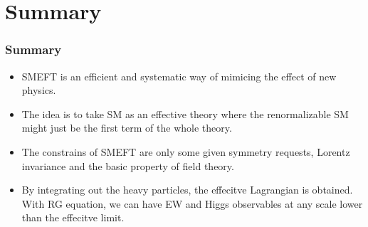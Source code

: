 \documentclass[8pt]{beamer}
\begin{document}
\section{Summary}
\begin{frame}
  \frametitle{Summary}
  \begin{itemize}
  \item SMEFT is an efficient and systematic way of mimicing the effect of new physics. 
  
  \item The idea is to take SM as an effective theory where the renormalizable SM might just be the first term of the whole theory.

  \item The constrains of SMEFT are only some given symmetry requests, Lorentz invariance and the basic property of field theory.
  
  \item By integrating out the heavy particles, the effecitve Lagrangian is obtained. With RG equation, we can have EW and Higgs observables at any scale lower than the effecitve limit.
  \end{itemize}
\end{frame}
\end{document}
